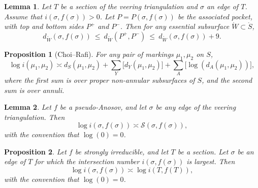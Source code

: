 \documentclass[10pt,a4paper]{amsart}
\newtheorem{lemma}{Lemma}
\newtheorem{proposition}{Proposition}
\newcommand{\mc}{\mathcal}
\newcommand{\mr}{\mathring}
\newcommand{\psub}{\mr W}
\begin{document}
\begin{lemma}
\label{Lem:ClosestSecSubsurfaceDist}
Let $T$ be a section of the veering triangulation and $\sigma$ an edge of $T$. 
Assume that $i(\sigma, f(\sigma)) > 0$. Let $P = P(\sigma, f(\sigma))$ be the associated pocket, with top and bottom sides $P^+$ and $P^-$.
Then
for any essential subsurface $\psub \subset \mr S$,
\[
d_{\psub}(\sigma , f(\sigma)) \: \leq \: d_{\psub}(P^+, P^-) \: \leq \:  d_{\psub}(\sigma , f(\sigma)) + 9.
\]
\end{lemma}

\begin{proposition}[Choi--Rafi]\label{Prop:ChoiRafi}
For any pair of markings $\mu_1,\mu_2$ on $S$,
\[
\log i(\mu_1,\mu_2) \asymp d_S (\mu_1, \mu_2) + \sum_Y \big[ d_Y(\mu_1,\mu_2) \big] + \sum_A \big[ \log \left (d_A(\mu_1,\mu_2) \right ) \big],
\]
where the first sum is over proper non-annular subsurfaces of $S$, and the second sum is over annuli. 
\end{proposition}

\begin{lemma}\label{Lem:SSumSigma}
Let $f$ be a pseudo-Anosov, and let $\sigma$ be any edge of the veering triangulation. Then
\[
\log i(\sigma, f(\sigma)) \asymp \mc S(\sigma, f(\sigma)),
\]
with the convention that $\log(0)=0$.
\end{lemma}

\begin{proposition}\label{Prop:FromTriangToEdge}
Let $f$ be strongly irreducible, and let $T$ be a section. 
Let $\sigma$ be an edge of $T$ for which the intersection number $i(\sigma, f(\sigma))$ is largest. Then
\[
\log i(\sigma, f(\sigma)) \asymp \log i(T, f(T)),
\]
with the convention that $\log(0)=0$.
\end{proposition}
\end{document}

